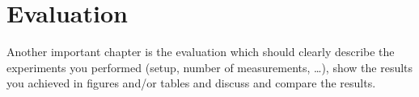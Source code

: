 \chapter{Evaluation}
\label{cha:evaluation}

Another important chapter is the evaluation which should clearly describe the
experiments you performed (setup, number of measurements, \dots), show the
results you achieved in figures and/or tables and discuss and compare the
results.
